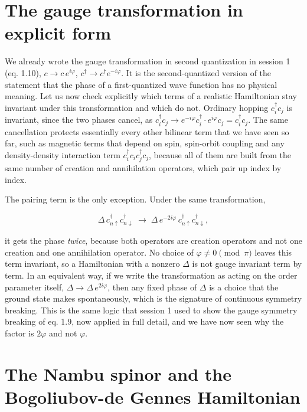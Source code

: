 \section{The gauge transformation in explicit form}

We already wrote the gauge transformation in second quantization in session 1 (eq. 1.10), $c \to
c\, e^{i\varphi}$, $c^\dagger \to c^\dagger e^{-i\varphi}$. It is the second-quantized version of
the statement that the phase of a first-quantized wave function has no physical meaning. Let us now
check explicitly which terms of a realistic Hamiltonian stay invariant under this transformation and
which do not. Ordinary hopping $c_i^\dagger c_j$ is invariant, since the two phases cancel, as
$c_i^\dagger c_j \to
e^{-i\varphi}c_i^\dagger \cdot e^{i\varphi} c_j = c_i^\dagger c_j$. The same cancellation protects
essentially every other bilinear term that we have seen so far, such as magnetic terms that depend
on spin, spin-orbit coupling and any density-density interaction term $c_i^\dagger c_i c_j^\dagger
c_j$, because all of them are built from the same number of creation and annihilation operators,
which pair up index by index.

The pairing term is the only exception. Under the same transformation,

\begin{equation}
\Delta\, c_{n\uparrow}^\dagger c_{n\downarrow}^\dagger \;\longrightarrow\; \Delta\, e^{-2i\varphi}\, c_{n\uparrow}^\dagger c_{n\downarrow}^\dagger,
\end{equation}

it gets the phase \emph{twice}, because both operators are creation operators and not one creation
and one annihilation operator. No choice of $\varphi \ne 0 \pmod \pi$ leaves this term invariant, so
a Hamiltonian with a nonzero $\Delta$ is not gauge invariant term by term. In an equivalent way, if
we write the transformation as acting on the order parameter itself, $\Delta \to \Delta\,
e^{2i\varphi}$, then any fixed phase of $\Delta$ is a choice that the ground state makes
spontaneously, which is the signature of continuous symmetry breaking. This is the same logic that
session 1 used to show the gauge symmetry breaking of eq. 1.9, now applied in full detail, and we
have now seen why the factor is $2\varphi$ and not $\varphi$.

\section{The Nambu spinor and the Bogoliubov-de Gennes Hamiltonian}

